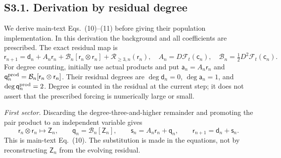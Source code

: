 \documentclass[10pt,letterpaper]{article}
\newcommand{\F}{\mathcal F}\newcommand{\B}{\mathcal B}
\newcommand{\fld}[1]{\mathsf{#1}}
\begin{document}
\subsection*{S3.1. Derivation by residual degree}
We derive main-text Eqs.~(10)--(11) before giving their population implementation. In this derivation the background and all coefficients are prescribed. The exact residual map is
\begin{equation}
 \fld r_{n+1}=\fld d_n+A_n\fld r_n+\B_n[\fld r_n\otimes\fld r_n]+\mathcal R_{\geq3,n}(\fld r_n),
 \quad A_n=D\F_t(\fld c_n),\quad \B_n=\tfrac12D^2\F_t(\fld c_n).
\end{equation}
For degree counting, initially use actual products and put $\fld a_n=A_n\fld r_n$ and $\fld q_n^{\rm prod}=\B_n[\fld r_n\otimes\fld r_n]$. Their residual degrees are $\deg\fld d_n=0$, $\deg\fld a_n=1$, and $\deg\fld q_n^{\rm prod}=2$. Degree is counted in the residual at the current step; it does not assert that the prescribed forcing is numerically large or small.

\textit{First sector.} Discarding the degree-three-and-higher remainder and promoting the pair product to an independent variable gives
\begin{equation}
 \fld r_n\otimes\fld r_n\longmapsto\fld Z_n,\qquad
 \fld q_n=\B_n[\fld Z_n],\qquad \fld s_n=A_n\fld r_n+\fld q_n,
 \qquad \fld r_{n+1}=\fld d_n+\fld s_n.
 \label{eq:derivefirst}
\end{equation}
This is main-text Eq.~(10). The substitution is made in the equations, not by reconstructing $\fld Z_n$ from the evolving residual.
\end{document}
